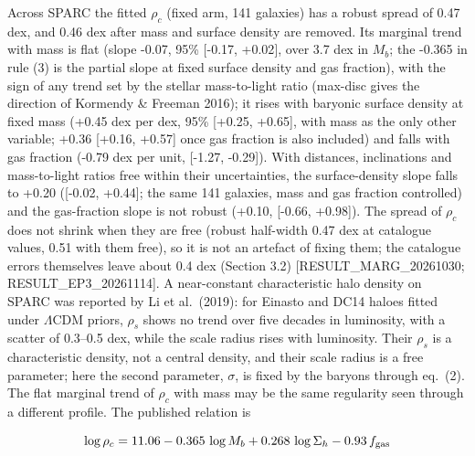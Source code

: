 \documentclass[
  10pt,
]{article}
\begin{document}
Across SPARC the fitted $\rho_c$ (fixed arm, 141 galaxies) has a robust spread of 0.47 dex, and 0.46 dex after mass and surface density are removed. Its marginal trend with mass is flat (slope -0.07, 95\% {[}-0.17, +0.02{]}, over 3.7 dex in $M_b$; the -0.365 in rule (3) is the partial slope at fixed surface density and gas fraction), with the sign of any trend set by the stellar mass-to-light ratio (max-disc gives the direction of Kormendy \& Freeman 2016); it rises with baryonic surface density at fixed mass (+0.45 dex per dex, 95\% {[}+0.25, +0.65{]}, with mass as the only other variable; +0.36 {[}+0.16, +0.57{]} once gas fraction is also included) and falls with gas fraction (-0.79 dex per unit, {[}-1.27, -0.29{]}). With distances, inclinations and mass-to-light ratios free within their uncertainties, the surface-density slope falls to +0.20 ({[}-0.02, +0.44{]}; the same 141 galaxies, mass and gas fraction controlled) and the gas-fraction slope is not robust (+0.10, {[}-0.66, +0.98{]}). The spread of $\rho_c$ does not shrink when they are free (robust half-width 0.47 dex at catalogue values, 0.51 with them free), so it is not an artefact of fixing them; the catalogue errors themselves leave about 0.4 dex (Section 3.2) {[}RESULT\_MARG\_20261030; RESULT\_EP3\_20261114{]}. A near-constant characteristic halo density on SPARC was reported by Li et al.~(2019): for Einasto and DC14 haloes fitted under $\Lambda$CDM priors, $\rho_s$ shows no trend over five decades in luminosity, with a scatter of 0.3--0.5 dex, while the scale radius rises with luminosity. Their $\rho_s$ is a characteristic density, not a central density, and their scale radius is a free parameter; here the second parameter, $\sigma$, is fixed by the baryons through eq.~(2). The flat marginal trend of $\rho_c$ with mass may be the same regularity seen through a different profile. The published
relation is

\begin{equation}
\log\rho_c = 11.06 - 0.365\,\log M_b + 0.268\,\log\Sigma_h - 0.93\,f_{\rm gas}
\end{equation}
\end{document}

